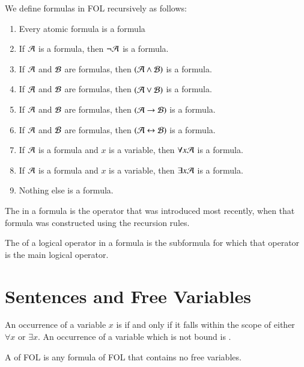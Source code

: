 \documentclass[12pt, a4paper, oneside, openright, titlepage]{book}
\begin{document}
\begin{defn}
    We define formulas in FOL recursively as follows: \begin{enumerate}
        \item Every atomic formula is a formula
        \item If $\mathcal{A}$ is a formula, then $\neg \mathcal{A}$ is a formula.
        \item If $\mathcal{A}$ and $\mathcal{B}$ are formulas, then $(\mathcal{A}\wedge\mathcal{B})$ is a formula.
        \item If $\mathcal{A}$ and $\mathcal{B}$ are formulas, then $(\mathcal{A} \vee \mathcal{B})$ is a formula.
        \item If $\mathcal{A}$ and $\mathcal{B}$ are formulas, then $(\mathcal{A} \rightarrow \mathcal{B})$ is a formula.
        \item If $\mathcal{A}$ and $\mathcal{B}$ are formulas, then $(\mathcal{A} \leftrightarrow \mathcal{B})$ is a formula.
        \item If $\mathcal{A}$ is a formula and $x$ is a variable, then $\forall x\mathcal{A}$ is a formula.
        \item If $\mathcal{A}$ is a formula and $x$ is a variable, then $\exists x \mathcal{A}$ is a formula.
        \item Nothing else is a formula.
    \end{enumerate}
\end{defn}


\begin{defn}
    The  in a formula is the operator that was introduced most recently, when that formula was constructed using the recursion rules.

    The  of a logical operator in a formula is the subformula for which that operator is the main logical operator.
\end{defn}


\section{\textsection Sentences and Free Variables}


\begin{defn}
    An occurrence of a variable $x$ is  if and only if it falls within the scope of either $\forall x$ or $\exists x$. An occurrence of a variable which is not bound is .
\end{defn}


\begin{defn}
    A  of FOL is any formula of FOL that contains no free variables.
\end{defn}
\end{document}
